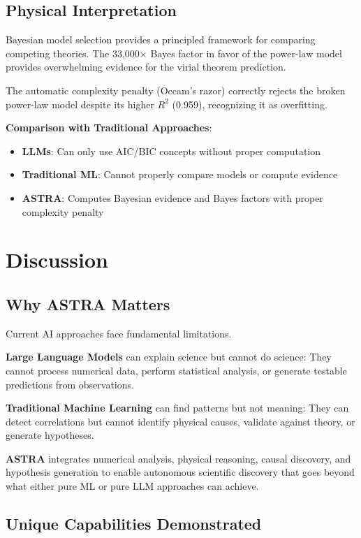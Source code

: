 \documentclass[usenatbib]{rasti}
\begin{document}
\subsection{Physical Interpretation}

Bayesian model selection provides a principled framework for comparing competing theories. The 33,000$\times$ Bayes factor in favor of the power-law model provides overwhelming evidence for the virial theorem prediction.

The automatic complexity penalty (Occam's razor) correctly rejects the broken power-law model despite its higher $R^2$ (0.959), recognizing it as overfitting.

\textbf{Comparison with Traditional Approaches}:
\begin{itemize}
\item \textbf{LLMs}: Can only use AIC/BIC concepts without proper computation
\item \textbf{Traditional ML}: Cannot properly compare models or compute evidence
\item \textbf{ASTRA}: Computes Bayesian evidence and Bayes factors with proper complexity penalty
\end{itemize}

\section{Discussion}

\subsection{Why ASTRA Matters}

Current AI approaches face fundamental limitations.

\textbf{Large Language Models} can explain science but cannot do science: They cannot process numerical data, perform statistical analysis, or generate testable predictions from observations.

\textbf{Traditional Machine Learning} can find patterns but not meaning: They can detect correlations but cannot identify physical causes, validate against theory, or generate hypotheses.

\textbf{ASTRA} integrates numerical analysis, physical reasoning, causal discovery, and hypothesis generation to enable autonomous scientific discovery that goes beyond what either pure ML or pure LLM approaches can achieve.

\subsection{Unique Capabilities Demonstrated}
\end{document}
